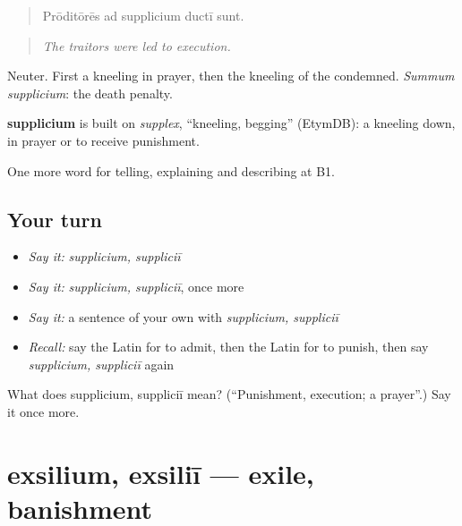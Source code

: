 \begin{quote}
Prōditōrēs ad supplicium ductī sunt.
\end{quote}

\begin{quote}
\emph{The traitors were led to execution.}
\end{quote}

Neuter. First a kneeling in prayer, then the kneeling of the condemned. \emph{Summum supplicium}: the death penalty.

\begin{cousinweb}
\textbf{supplicium} is built on \emph{supplex}, \textquotedblleft{}kneeling, begging\textquotedblright{} (EtymDB): a kneeling down, in prayer or to receive punishment.
\end{cousinweb}

\begin{grammarlens}[title={What you've built}]
One more word for telling, explaining and describing at B1.
\end{grammarlens}

\subsection*{Your turn}
\begin{itemize}
\raggedright
  \item \emph{Say it:} \emph{supplicium, suppliciī}
  \item \emph{Say it:} \emph{supplicium, suppliciī}, once more
  \item \emph{Say it:} a sentence of your own with \emph{supplicium, suppliciī}
  \item \emph{Recall:} say the Latin for to admit, then the Latin for to punish, then say \emph{supplicium, suppliciī} again
\end{itemize}

\begin{tcolorbox}[breakable,colback=teal!4,colframe=teal!35!black,title={Before you move on}]
What does supplicium, suppliciī mean? (\textquotedblleft{}Punishment, execution; a prayer\textquotedblright{}.) Say it once more.
\end{tcolorbox}
\section[exsilium, exsiliī]{exsilium, exsiliī — exile, banishment}

\label{lesson:LA-C312-exsilium}



